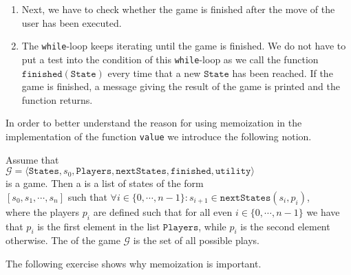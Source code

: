 \begin{enumerate}
\begin{enumerate}
      \item Next, we have to check whether the game is finished after the  move of the user has been executed.
      \item The \texttt{while}-loop keeps iterating until the game is finished.
            We do not have to put a test into the condition of this \texttt{while}-loop as we call the function
            $\texttt{finished}(\texttt{State})$ every time that a new $\texttt{State}$ has been reached.
            If the game is finished, a message giving the result of the game is printed and the function returns.
      \end{enumerate}
\end{enumerate}
In order to better understand the reason for using memoization in the implementation of the function
\texttt{value} we introduce the following notion.
\begin{Definition}
  Assume that
  \\[0.2cm]
  \hspace*{1.3cm}
  $\mathcal{G} = \langle \texttt{States}, s_0, \texttt{Players}, \texttt{nextStates}, \texttt{finished},\texttt{utility} \rangle$
  \\[0.2cm]
  is a game. Then a  is a list of states of the form 
  \\[0.2cm]
  \hspace*{1.3cm}
  $[s_0, s_1, \cdots, s_n]$ \quad such that \quad $\forall i\in\{0,\cdots,n-1\}: s_{i+1} \in \texttt{nextStates}(s_i, p_i)$,
  \\[0.2cm]
  where the players $p_i$ are defined such that for all even $i\in\{0,\cdots,n-1\}$ we have that $p_i$ is the
  first element in the list $\texttt{Players}$, while $p_i$ is the second element otherwise.
  The  of the game $\mathcal{G}$ is the set of all possible plays.  \eoxs
\end{Definition}

\noindent
The following exercise shows why memoization is important.

